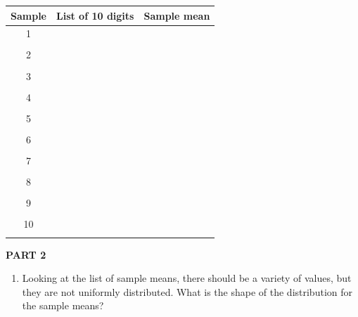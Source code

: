 \documentclass{article}
\begin{document}
\begin{enumerate}
\begin{center}
\begin{tabular}{|c|c||c|}
\hline
Sample & List of 10 digits & Sample mean \\
\hline
1 & \hspace{3in} & \hspace{1in} \\
&&\\ \hline
2 & \hspace{3in} & \hspace{1in} \\
&&\\ \hline
3 & \hspace{3in} & \hspace{1in} \\
&&\\ \hline
4 & \hspace{3in} & \hspace{1in} \\
&&\\ \hline
5 & \hspace{3in} & \hspace{1in} \\
&&\\ \hline
6 & \hspace{3in} & \hspace{1in} \\
&&\\ \hline
7 & \hspace{3in} & \hspace{1in} \\
&&\\ \hline
8 & \hspace{3in} & \hspace{1in} \\
&&\\ \hline
9 & \hspace{3in} & \hspace{1in} \\
&&\\ \hline
10 & \hspace{3in} & \hspace{1in} \\
&&\\ \hline
\end{tabular}

\end{center}


\textbf{PART 2}

\begin{enumerate}

\item Looking at the list of sample means, there should be a variety of values, but they are not uniformly distributed. What is the shape of the distribution for the sample means?


\end{enumerate}
\end{enumerate}
\end{document}
